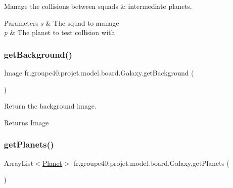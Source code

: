 Manage the collisions between squads \& intermediate planets. 


\begin{DoxyParams}{Parameters}
{\em s} & The squad to manage \\
\hline
{\em p} & The planet to test collision with \\
\hline
\end{DoxyParams}
\mbox{\label{classfr_1_1groupe40_1_1projet_1_1model_1_1board_1_1_galaxy_adc4718307d1288fe07acabd1f31415c9}} 
\subsubsection{\texorpdfstring{get\+Background()}{getBackground()}}
{\footnotesize\ttfamily Image fr.\+groupe40.\+projet.\+model.\+board.\+Galaxy.\+get\+Background (\begin{DoxyParamCaption}{ }\end{DoxyParamCaption})}



Return the background image. 

\begin{DoxyReturn}{Returns}
Image 
\end{DoxyReturn}
\mbox{\label{classfr_1_1groupe40_1_1projet_1_1model_1_1board_1_1_galaxy_a9e97906db3f8da0d99dfcb0f272d476b}} 
\subsubsection{\texorpdfstring{get\+Planets()}{getPlanets()}}
{\footnotesize\ttfamily Array\+List$<$\hyperlink{classfr_1_1groupe40_1_1projet_1_1model_1_1planets_1_1_planet}{Planet}$>$ fr.\+groupe40.\+projet.\+model.\+board.\+Galaxy.\+get\+Planets (\begin{DoxyParamCaption}{ }\end{DoxyParamCaption})}



